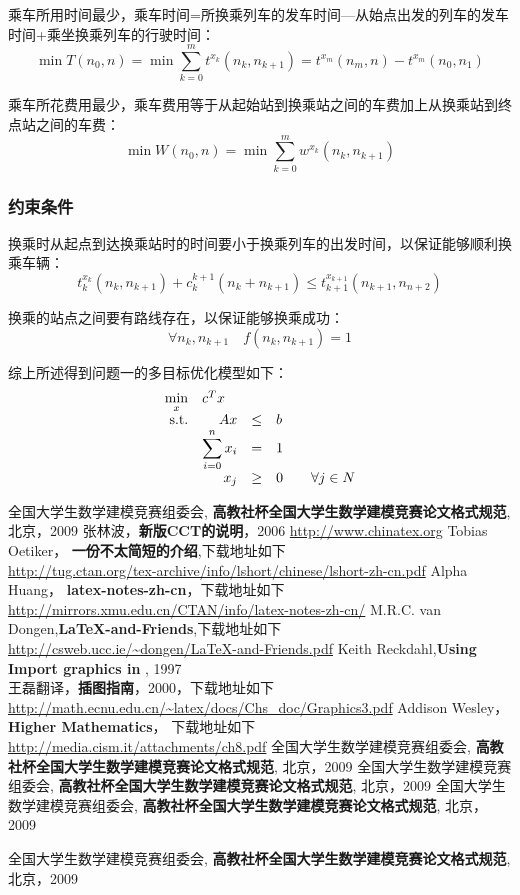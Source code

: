 \documentclass[UTF8]{ctexart}
\begin{document}
乘车所用时间最少，乘车时间=所换乘列车的发车时间—从始点出发的列车的发车时间+乘坐换乘列车的行驶时间：
\[\min T(n_0,n) = \min \sum_{ k=0}^{m} t^{x_k}(n_k,n_{k+1})  = t^{x_m}(n_m,n)-t^{x_m}(n_0,n_1)\]

乘车所花费用最少，乘车费用等于从起始站到换乘站之间的车费加上从换乘站到终点站之间的车费：
\[\min W(n_0,n) = \min \sum_{k=0}^{m} w^{x_k} (n_k,n_{k+1})\]

\subsubsection{约束条件}
换乘时从起点到达换乘站时的时间要小于换乘列车的出发时间，以保证能够顺利换乘车辆：
\[
t^{x_k}_k(n_k,n_{k+1}) + c^{k+1}_k (n_k+n_{k+1}) \leq t^{x_{k+1}}_{k+1}(n_{k+1},n_{n+2})
\]

换乘的站点之间要有路线存在，以保证能够换乘成功：
\[
\forall n_k, n_{k+1} \quad f(n_k,n_{k+1})=1 
\]

综上所述得到问题一的多目标优化模型如下：
\begin{equation}
\begin{array}{rrclcl}
\displaystyle \min_{x} & \multicolumn{3}{l}{c^T x} \\
\textrm{s.t.} & A x & \leq & b \\
&\displaystyle \sum_{i=0}^{n} x_i & = & 1 \\
& x_j & \geq & 0 & & \forall j \in N \\
\end{array}
\end{equation}
\begin{thebibliography}{10}
 全国大学生数学建模竞赛组委会, \textbf{高教社杯全国大学生数学建模竞赛论文格式规范}, 北京，2009
张林波，\textbf{新版CCT的说明}，2006
 \url{http://www.chinatex.org}
Tobias Oetiker， \textbf{一份不太简短的\LaTeXe 介绍},{下载地址如下}\\
    \url{http://tug.ctan.org/tex-archive/info/lshort/chinese/lshort-zh-cn.pdf}
 Alpha Huang， \textbf{latex-notes-zh-cn}，下载地址如下\\
    \url{http://mirrors.xmu.edu.cn/CTAN/info/latex-notes-zh-cn/}
M.R.C. van Dongen,\textbf{\LaTeX-and-Friends},下载地址如下\\
    \url{http://csweb.ucc.ie/~dongen/LaTeX-and-Friends.pdf}
Keith Reckdahl,\textbf{Using Import graphics in \LaTeXe}, 1997\\
王磊翻译，\textbf{\LaTeXe 插图指南}，2000，下载地址如下\\
\url{http://math.ecnu.edu.cn/~latex/docs/Chs_doc/Graphics3.pdf}
Addison Wesley，\textbf{Higher Mathematics}， 下载地址如下\\ \url{http://media.cism.it/attachments/ch8.pdf}
 全国大学生数学建模竞赛组委会, \textbf{高教社杯全国大学生数学建模竞赛论文格式规范}, 北京，2009
 全国大学生数学建模竞赛组委会, \textbf{高教社杯全国大学生数学建模竞赛论文格式规范}, 北京，2009
 全国大学生数学建模竞赛组委会, \textbf{高教社杯全国大学生数学建模竞赛论文格式规范}, 北京，2009

 全国大学生数学建模竞赛组委会, \textbf{高教社杯全国大学生数学建模竞赛论文格式规范}, 北京，2009
\end{thebibliography}
\end{document}
